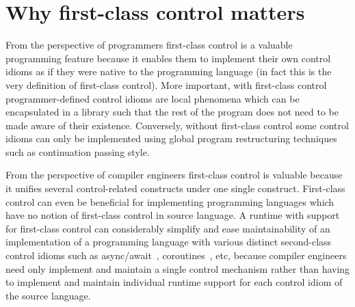\documentclass[12pt,phd,lfcs,twoside,openright,logo,leftchapter,normalheadings]{infthesis}
\theoremstyle{plain}
\theoremstyle{definition}
\begin{document}


\section{Why first-class control matters}
From the perspective of programmers first-class control is a valuable
programming feature because it enables them to implement their own
control idioms as if they were native to the programming language (in
fact this is the very definition of first-class control). More
important, with first-class control programmer-defined control idioms
are local phenomena which can be encapsulated in a library such that
the rest of the program does not need to be made aware of their
existence. Conversely, without first-class control some control idioms
can only be implemented using global program restructuring techniques
such as continuation passing style.

From the perspective of compiler engineers first-class control is
valuable because it unifies several control-related constructs under
one single construct. First-class control can even be beneficial for
implementing programming languages which have no notion of first-class
control in source language. A runtime with support for first-class
control can considerably simplify and ease maintainability of an
implementation of a programming language with various distinct
second-class control idioms such as async/await~\cite{SymePL11},
coroutines~\cite{MouraI09}, etc, because compiler engineers need only
implement and maintain a single control mechanism rather than having
to implement and maintain individual runtime support for each control
idiom of the source language.
\end{document}
